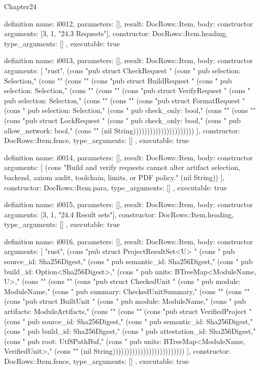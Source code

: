 \begin{lexlean}{Chapter24}
\begin{semanticmodule}
definition{
  name: i0012,
  parameters: [],
  result: DocRows::Item,
  body: constructor{
    arguments: [3, 1, "24.3 Requests"],
    constructor: DocRows::Item.heading,
    type_arguments: []
  },
  executable: true
}

definition{
  name: i0013,
  parameters: [],
  result: DocRows::Item,
  body: constructor{
    arguments: [
      "rust",
      (cons "pub struct CheckRequest {" (cons "    pub selection: Selection," (cons "}" (cons "" (cons "pub struct BuildRequest {" (cons "    pub selection: Selection," (cons "}" (cons "" (cons "pub struct VerifyRequest {" (cons "    pub selection: Selection," (cons "}" (cons "" (cons "pub struct FormatRequest {" (cons "    pub selection: Selection," (cons "    pub check_only: bool," (cons "}" (cons "" (cons "pub struct LockRequest {" (cons "    pub check_only: bool," (cons "    pub allow_network: bool," (cons "}" (nil String))))))))))))))))))))))
    ],
    constructor: DocRows::Item.fence,
    type_arguments: []
  },
  executable: true
}

definition{
  name: i0014,
  parameters: [],
  result: DocRows::Item,
  body: constructor{
    arguments: [
      (cons "Build and verify requests cannot alter artifact selection, backend, axiom audit, toolchain, limits, or PDF policy." (nil String))
    ],
    constructor: DocRows::Item.para,
    type_arguments: []
  },
  executable: true
}

definition{
  name: i0015,
  parameters: [],
  result: DocRows::Item,
  body: constructor{
    arguments: [3, 1, "24.4 Result sets"],
    constructor: DocRows::Item.heading,
    type_arguments: []
  },
  executable: true
}

definition{
  name: i0016,
  parameters: [],
  result: DocRows::Item,
  body: constructor{
    arguments: [
      "rust",
      (cons "pub struct ProjectResultSet<U> {" (cons "    pub source_id: Sha256Digest," (cons "    pub semantic_id: Sha256Digest," (cons "    pub build_id: Option<Sha256Digest>," (cons "    pub units: BTreeMap<ModuleName, U>," (cons "}" (cons "" (cons "pub struct CheckedUnit {" (cons "    pub module: ModuleName," (cons "    pub summary: CheckedUnitSummary," (cons "}" (cons "" (cons "pub struct BuiltUnit {" (cons "    pub module: ModuleName," (cons "    pub artifacts: ModuleArtifacts," (cons "}" (cons "" (cons "pub struct VerifiedProject {" (cons "    pub source_id: Sha256Digest," (cons "    pub semantic_id: Sha256Digest," (cons "    pub build_id: Sha256Digest," (cons "    pub attestation_id: Sha256Digest," (cons "    pub root: Utf8PathBuf," (cons "    pub units: BTreeMap<ModuleName, VerifiedUnit>," (cons "}" (nil String))))))))))))))))))))))))))
    ],
    constructor: DocRows::Item.fence,
    type_arguments: []
  },
  executable: true
}


\end{semanticmodule}
\end{lexlean}
